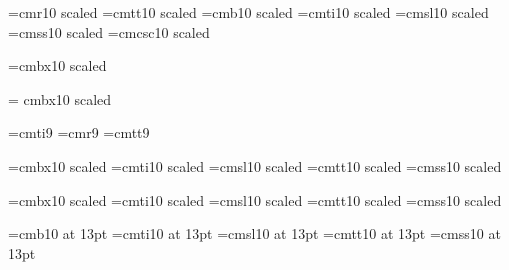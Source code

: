 \begin{\parsearg\beginxxx}
\def\inforef #1{\inforefzzz #1,,,,**}
\def\inforefzzz #1,#2,#3,#4**{See Info file \file{\losespace#3{}}, node `\losespace#1{}'}
\def\losespace #1{#1}



\font\tenrm=cmr10 scaled \magstephalf
\font\tentt=cmtt10 scaled \magstephalf
\font\tenbf=cmb10 scaled \magstephalf 
\font\tenit=cmti10 scaled \magstephalf
\font\tensl=cmsl10 scaled \magstephalf
\font\tensf=cmss10 scaled \magstephalf
\def\li{\sf}
\font\tensc=cmcsc10 scaled \magstephalf

\font{}=cmbx10 scaled  %
\let\deftt=\tentt
\def\df{\let\tt=\deftt \defbf}

\font\titlerm = cmbx10 scaled 

\font\indit=cmti9 \font\indrm=cmr9
\font\indtt=cmtt9
\def\indbf{\indrm} \def\indsl{\indit}
\def\indexfonts{\let\it=\indit \let\sl=\indsl \let\bf=\indbf \let\rm=\indrm
\let\tt=\indtt}

\font\chaprm=cmbx10 scaled 
\font\chapit=cmti10 scaled 
\font\chapsl=cmsl10 scaled 
\font\chaptt=cmtt10 scaled 
\font\chapsf=cmss10 scaled 
\let\chapbf=\chaprm

\font\secrm=cmbx10 scaled 
\font\secit=cmti10 scaled 
\font\secsl=cmsl10 scaled 
\font\sectt=cmtt10 scaled 
\font\secsf=cmss10 scaled 
\let\secbf=\secrm


\font\ssecrm=cmb10 at 13pt	%
\font\ssecit=cmti10 at 13pt	%
\font\ssecsl=cmsl10 at 13pt	%
\font\ssectt=cmtt10 at 13pt
\font\ssecsf=cmss10 at 13pt

\let\ssecbf=\ssecrm

\def\textfonts{\let\rm=\tenrm\let\it=\tenit\let\sl=\tensl\let\bf=\tenbf%
\let\smallcaps=\tensc\let\sf=\tensf}
\def\chapfonts{\let\rm=\chaprm\let\it=\chapit\let\sl=\chapsl\let\bf=\chapbf\let\tt=\chaptt\let\sf=\chapsf}
\def\secfonts{\let\rm=\secrm\let\it=\secit\let\sl=\secsl\let\bf=\secbf\let\tt=\sectt\let\sf=\secsf}
\def\subsecfonts{\let\rm=\ssecrm\let\it=\ssecit\let\sl=\ssecsl\let\bf=\ssecbf\let\tt=\ssectt\let\sf=\ssecsf}
\newcount\fontdepth {}


\end{\parsearg\beginxxx}
